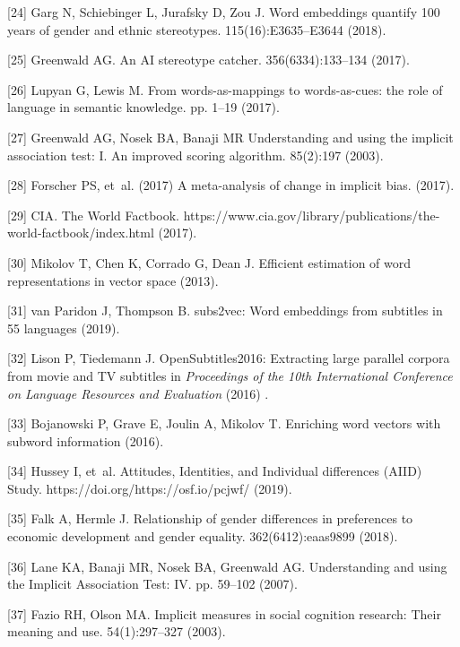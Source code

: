 \documentclass[9pt,twocolumn]{pnas-new}
\begin{document}
[24] Garg N, Schiebinger L, Jurafsky D, Zou J. Word embeddings quantify 100
  years of gender and ethnic stereotypes.
  115(16):E3635--E3644 (2018).

[25] Greenwald AG. An {AI} stereotype catcher.
 356(6334):133--134  (2017).

[26] Lupyan G, Lewis M. From words-as-mappings to words-as-cues: the role of
  language in semantic knowledge.
 pp. 1--19 (2017).

[27] Greenwald AG, Nosek BA, Banaji MR  Understanding and using the implicit
  association test: I. {A}n improved scoring algorithm.
 85(2):197 (2003).

[28] Forscher PS, et~al. (2017) A meta-analysis of change in implicit bias.
 (2017).

[29] {CIA}. The {W}orld {F}actbook.
\newblock
  https://www.cia.gov/library/publications/the-world-factbook/index.html (2017).

[30] Mikolov T, Chen K, Corrado G, Dean J. Efficient estimation of word
  representations in vector space  (2013).

[31] van Paridon J, Thompson B. subs2vec: Word embeddings from subtitles in 55
  languages (2019).

[32] Lison P, Tiedemann J. {OpenSubtitles201}6: Extracting large parallel
  corpora from movie and {TV} subtitles in {\em Proceedings of the 10th
  {I}nternational {C}onference on {L}anguage {R}esources and {E}valuation} (2016) .

[33] Bojanowski P, Grave E, Joulin A, Mikolov T. Enriching word vectors with
  subword information (2016).

[34] Hussey I, et~al.  {A}ttitudes, {I}dentities, and {I}ndividual differences
  ({AIID}) {S}tudy.
\newblock https://doi.org/https://osf.io/pcjwf/ (2019).

[35] Falk A, Hermle J. Relationship of gender differences in preferences to
  economic development and gender equality.
 362(6412):eaas9899 (2018).

[36] Lane KA, Banaji MR, Nosek BA, Greenwald AG. Understanding and using the
  {I}mplicit {A}ssociation {T}est: {IV}.
 pp. 59--102 (2007).

[37] Fazio RH, Olson MA. Implicit measures in social cognition research: Their
  meaning and use.
 54(1):297--327 (2003).
\end{document}
